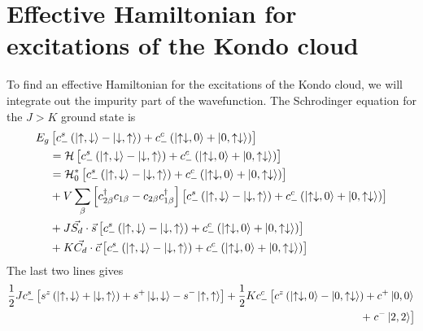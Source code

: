 \documentclass[12pt,twoside]{report}
\numberwithin{equation}{section}
\begin{document}
\section{Effective Hamiltonian for excitations of the Kondo cloud}
To find an effective Hamiltonian for the excitations of the Kondo cloud, we will integrate out the impurity part of the wavefunction. The Schrodinger equation for the \(J > K\) ground state is
\begin{equation}\begin{aligned}
	E_g &\left[c_-^s \left(\ket{\uparrow, \downarrow} - \ket{\downarrow, \uparrow}\right) + c^c_- \left(\ket{\uparrow\downarrow, 0} + \ket{0, \uparrow\downarrow}\right)\right] \\
	    &= \mathcal{H} \left[c_-^s \left(\ket{\uparrow, \downarrow} - \ket{\downarrow, \uparrow}\right) + c^c_- \left(\ket{\uparrow\downarrow, 0} + \ket{0, \uparrow\downarrow}\right)\right]\\
	    &= \mathcal{H}_0^* \left[c_-^s \left(\ket{\uparrow, \downarrow} - \ket{\downarrow, \uparrow}\right) + c^c_- \left(\ket{\uparrow\downarrow, 0} + \ket{0, \uparrow\downarrow}\right)\right]\\
	    &+V\sum_{\beta}\left[c^\dagger_{2\beta}c_{1\beta} - c_{2\beta}c^\dagger_{1\beta}\right]\left[c_-^s \left(\ket{\uparrow, \downarrow} - \ket{\downarrow, \uparrow}\right) + c^c_- \left(\ket{\uparrow\downarrow, 0} + \ket{0, \uparrow\downarrow}\right)\right]\\
	    &+ J \vec{S_d}\cdot\vec{s}\left[c_-^s \left(\ket{\uparrow, \downarrow} - \ket{\downarrow, \uparrow}\right) + c^c_- \left(\ket{\uparrow\downarrow, 0} + \ket{0, \uparrow\downarrow}\right)\right]\\
	    &+ K \vec{C_d}\cdot\vec{c}\left[c_-^s \left(\ket{\uparrow, \downarrow} - \ket{\downarrow, \uparrow}\right) + c^c_- \left(\ket{\uparrow\downarrow, 0} + \ket{0, \uparrow\downarrow}\right)\right]
\end{aligned}\end{equation}
The last two lines gives
\begin{equation}\begin{aligned}
\frac{1}{2}Jc_-^s \left[s^z \left(\ket{\uparrow, \downarrow} + \ket{\downarrow, \uparrow}\right) +  s^+ \ket{\downarrow, \downarrow} - s^-\ket{\uparrow, \uparrow}\right] + \frac{1}{2}Kc^c_- \left[c^z\left(\ket{\uparrow\downarrow, 0} - \ket{0, \uparrow\downarrow}\right) + c^+\ket{0, 0} \right.\\
+ \left.c^-\ket{2, 2}\right]
\end{aligned}\end{equation}
\end{document}
